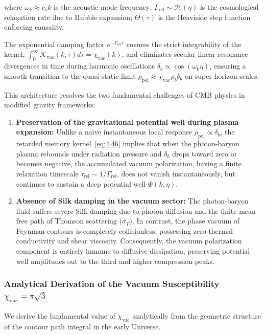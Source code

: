 where $\omega_k \approx c_s k$ is the acoustic mode frequency;  
$\Gamma_{\text{rel}} \sim \mathcal{H}(\eta)$ is the cosmological relaxation rate due to Hubble expansion;  
$\Theta(\tau)$ is the Heaviside step function enforcing causality.

The exponential damping factor $e^{-\Gamma_{\text{rel}} \tau}$ ensures the strict integrability of the kernel, $\int_0^\infty \mathcal{K}_{\text{vac}}(k, \tau) d\tau = \chi_{\text{vac}}(k)$, and eliminates secular linear resonance divergences in time during harmonic oscillations $\delta_b \propto \cos(\omega_k \eta)$, ensuring a smooth transition to the quasi-static limit $\rho_{\text{pol}} \approx \chi_{\text{vac}} \rho_b \delta_b$ on super-horizon scales.

This architecture resolves the two fundamental challenges of CMB physics in modified gravity frameworks:
\begin{enumerate}
\item \textbf{Preservation of the gravitational potential well during plasma expansion:} Unlike a naive instantaneous local response $\rho_{\text{pol}} \propto \delta_b$, the retarded memory kernel~\eqref{eq:4.46} implies that when the photon-baryon plasma rebounds under radiation pressure and $\delta_b$ drops toward zero or becomes negative, the accumulated vacuum polarization, having a finite relaxation timescale $\tau_{\text{rel}} \sim 1/\Gamma_{\text{rel}}$, does not vanish instantaneously, but continues to sustain a deep potential well $\Phi(k, \eta)$.
\item \textbf{Absence of Silk damping in the vacuum sector:} The photon-baryon fluid suffers severe Silk damping due to photon diffusion and the finite mean free path of Thomson scattering ($\sigma_T$). In contrast, the phase vacuum of Feynman contours is completely collisionless, possessing zero thermal conductivity and shear viscosity. Consequently, the vacuum polarization component is entirely immune to diffusive dissipation, preserving potential well amplitudes out to the third and higher compression peaks.
\end{enumerate}


\subsubsection{Analytical Derivation of the Vacuum Susceptibility $\chi_{\text{vac}} = \pi\sqrt{3}$}

We derive the fundamental value of $\chi_{\text{vac}}$ analytically from the geometric structure of the contour path integral in the early Universe.

